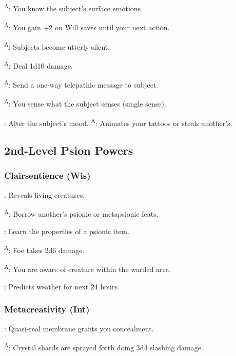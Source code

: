 \textsuperscript{A}: You know the subject's surface emotions.

\textsuperscript{A}: You gain +2 on Will saves until your next action.

\textsuperscript{A}: Subjects become utterly silent.

\textsuperscript{A}: Deal 1d10 damage.

\textsuperscript{A}: Send a one-way telepathic message to subject.

\textsuperscript{A}: You sense what the subject senses (single sense).

: Alter the subject's mood.
% 
\textsuperscript{A}: Animates your tattoos or steals another's.



\subsection{2nd-Level Psion Powers}


\subsubsection{Clairsentience (Wis)}

: Reveals living creatures.

\textsuperscript{A}: Borrow another's psionic or metapsionic feats.

: Learn the properties of a psionic item.

\textsuperscript{A}: Foe takes 2d6 damage.

\textsuperscript{A}: You are aware of creature within the warded area.

: Predicts weather for next 24 hours.


\subsubsection{Metacreativity (Int)}

: Quasi-real membrane grants you concealment.

\textsuperscript{A}: Crystal shards are sprayed forth doing 3d4 slashing damage.


